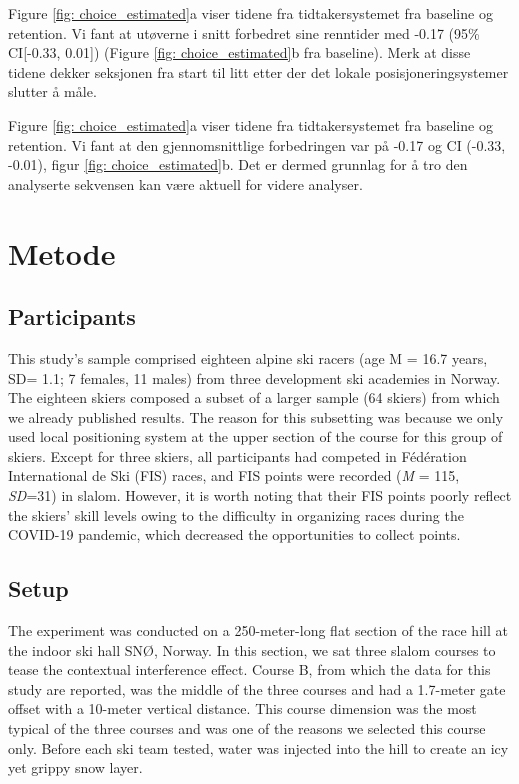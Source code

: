 \documentclass{article}
\begin{document}
Figure \ref{fig: choice_estimated}a viser tidene fra tidtakersystemet fra baseline og retention. Vi fant at utøverne i snitt forbedret sine renntider med -0.17 (95\% CI[-0.33, 0.01])  (Figure \ref{fig: choice_estimated}b fra baseline). Merk at disse tidene dekker seksjonen fra start til litt etter der det lokale posisjoneringsystemer slutter å måle.


Figure \ref{fig: choice_estimated}a viser tidene fra tidtakersystemet fra baseline og retention. Vi fant at den gjennomsnittlige forbedringen var på  -0.17 og CI (-0.33, -0.01), figur \ref{fig: choice_estimated}b. Det er dermed grunnlag for å tro den analyserte sekvensen kan være aktuell for videre analyser.


\section{Metode}


\subsection*{Participants}
This study's sample comprised eighteen alpine ski racers (age M = 16.7 years, SD= 1.1; 7 females, 11 males) from three development ski academies in Norway. The eighteen skiers composed a subset of a larger sample (64 skiers) from which we already published results. The reason for this subsetting was because we only used local positioning system at the upper section of the course for this group of skiers. Except for three skiers, all participants had competed in Fédération International de Ski (FIS) races, and FIS points were recorded (\textit{M} = 115, \textit{SD}=31) in slalom. However, it is worth noting that their FIS points poorly reflect the skiers' skill levels owing to the difficulty in organizing races during the COVID-19 pandemic, which decreased the opportunities to collect points.  

\subsection{Setup}

The experiment was conducted on a 250-meter-long flat section of the race hill at the indoor ski hall SNØ, Norway. In this section, we sat three slalom courses to tease the contextual interference effect. Course B, from which the data for this study are reported, was the middle of the three courses and had a 1.7-meter gate offset with a 10-meter vertical distance. This course dimension was the most typical of the three courses and was one of the reasons we selected this course only. Before each ski team tested, water was injected into the hill to create an icy yet grippy snow layer.
\end{document}
